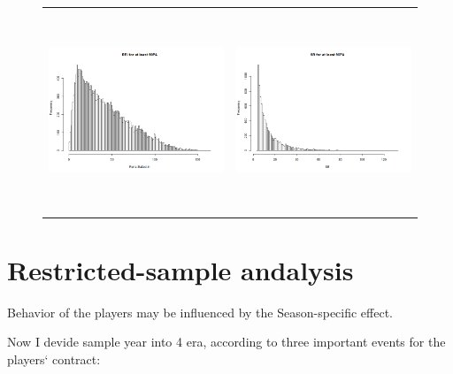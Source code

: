 \documentclass[dvipdfmx]{article}
\begin{document}
\begin{itemize}
\begin{figure}[H]
\begin{tabular}{cc}
    \includegraphics[width = 8cm, height = 6cm]{graphs/RBI_90PA.png} &
    \includegraphics[width = 8cm, height = 6cm]{graphs/SB_5SB.png} \\
   \end{tabular}
 \end{figure}



  \begin{landscape}
    
  \end{landscape}



   \begin{landscape}
     

     
   \end{landscape}

  \end{itemize}

 \section{Restricted-sample andalysis}

 Behavior of the players may be influenced by the Season-specific effect.

 Now I devide sample year into 4 era, according to three important
 events for the players` contract:
\end{document}
